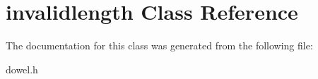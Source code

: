 \hypertarget{classinvalidlength}{\section{invalidlength Class Reference}
\label{classinvalidlength}
}


The documentation for this class was generated from the following file\-:\begin{DoxyCompactItemize}
\item 
dowel.\-h\end{DoxyCompactItemize}
